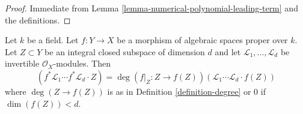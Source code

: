 \begin{proof}
Immediate from Lemma \ref{lemma-numerical-polynomial-leading-term}
and the definitions.
\end{proof}

\begin{lemma}
\label{lemma-intersection-number-and-pullback}
Let $k$ be a field. Let $f : Y \to X$ be a morphism of
algebraic spaces proper over $k$.
Let $Z \subset Y$ be an integral closed subspace of dimension $d$ and let
$\mathcal{L}_1, \ldots, \mathcal{L}_d$ be invertible $\mathcal{O}_X$-modules.
Then
$$
(f^*\mathcal{L}_1 \cdots f^*\mathcal{L}_d \cdot Z) =
\deg(f|_Z : Z \to f(Z)) (\mathcal{L}_1 \cdots \mathcal{L}_d \cdot f(Z))
$$
where $\deg(Z \to f(Z))$ is as in Definition \ref{definition-degree}
or $0$ if $\dim(f(Z)) < d$.
\end{lemma}


